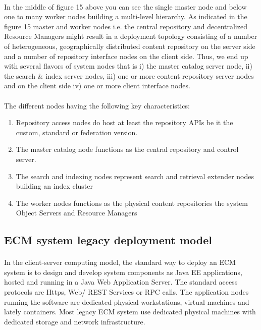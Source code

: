 \documentclass[EPiC]{easychair} %
\begin{document}
    \paragraph{} In the middle of figure 15 above you can see the single master node and below one to many worker nodes building a multi-level hierarchy. As indicated in the figure 15  master and worker nodes i.e. the central repository and decentralized Resource Managers might result in a deployment topology consisting of a number of heterogeneous, geographically distributed content repository on the server side and a number of repository interface nodes on the client side. Thus, we end up with several flavors of system nodes that is i) the master catalog server node, ii) the search \& index server nodes, iii) one or more content repository server nodes and on the client side  iv) one or more client interface nodes. 

\paragraph{} The different nodes having the following key characteristics: 

\begin{enumerate}
    \item Repository access nodes do host at least the repository APIs be it the custom, standard or federation version. 
    \item The master catalog node functions as the central repository and control server. 
    \item  The search and indexing nodes represent search and retrieval extender nodes building an index cluster  
    \item The worker nodes functions as the physical content repositories the system Object Servers and Resource Managers 
\end{enumerate}

\subsection{ECM system legacy deployment model}

    \paragraph{} In the client-server computing model, the standard way to deploy an ECM system is to design and develop system components as Java EE applications, hosted and running in a Java Web Application Server. The standard access protocols are Https, Web/ REST Services or RPC calls. The application nodes running the software are dedicated physical workstations, virtual machines and lately containers. Most legacy ECM system use dedicated physical machines with dedicated storage and network infrastructure.
\end{document}
